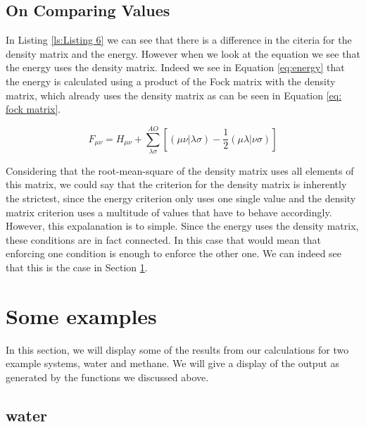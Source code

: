  \subsection{On Comparing Values}
 \label{subsec:step6.1}
In Listing \ref{ls:Listing 6} we can see that there is a difference in the
citeria for the density matrix and the energy. However when we look at the 
equation we see that the energy uses the density matrix. Indeed we see in 
Equation \ref{eq:energy} that the energy is calculated using a 
product of the Fock matrix with the density matrix, which already uses the density
matrix as can be seen in Equation \ref{eq: fock matrix}.
 
 \begin{equation} \label{eq: fock matrix}
     F_{\mu\nu} = H_{\mu\nu} + \sum^{AO}_{\lambda\sigma}[(\mu\nu|\lambda\sigma) - \frac{1}{2}(\mu\lambda|\nu\sigma)]
 \end{equation}

Considering that the root-mean-square of the density matrix uses all elements of 
this matrix, we could say that the criterion for the density matrix is inherently
the strictest, since the energy criterion only uses one single value and the 
density matrix criterion uses a multitude of values that have to behave 
accordingly. However, this expalanation is to simple. Since the energy uses 
the density matrix, these conditions are in fact connected. In this case that 
would mean that enforcing one condition is enough to enforce the other one. 
We can indeed see that this is the case in Section \ref{sec: examples}. 

 
 \section{Some examples}
 \label{sec: examples}
 In this section, we will display some of the results from our calculations for 
 two example systems, water and methane. We will give a display of the output as 
 generated by the functions we discussed above.
 
 \subsection{water}
 \label{subsec:water}

